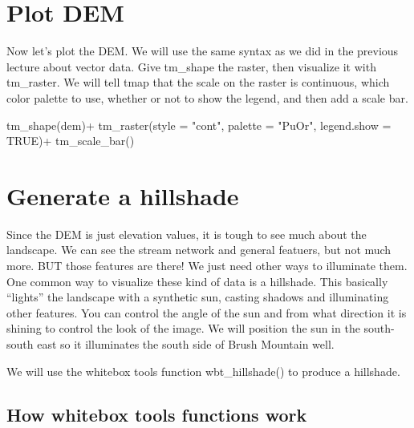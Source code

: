 \documentclass[
]{book}
\newenvironment{Shaded}{\begin{snugshade}}{\end{snugshade}}
\newcommand{\AttributeTok}[1]{\textcolor[rgb]{0.77,0.63,0.00}{#1}}
\newcommand{\ConstantTok}[1]{\textcolor[rgb]{0.00,0.00,0.00}{#1}}
\newcommand{\FunctionTok}[1]{\textcolor[rgb]{0.00,0.00,0.00}{#1}}
\newcommand{\NormalTok}[1]{#1}
\newcommand{\SpecialCharTok}[1]{\textcolor[rgb]{0.00,0.00,0.00}{#1}}
\newcommand{\StringTok}[1]{\textcolor[rgb]{0.31,0.60,0.02}{#1}}
\begin{document}
\hypertarget{plot-dem}{%
\section{Plot DEM}\label{plot-dem}}

Now let's plot the DEM. We will use the same syntax as we did in the previous lecture about vector data. Give tm\_shape the raster, then visualize it with tm\_raster. We will tell tmap that the scale on the raster is continuous, which color palette to use, whether or not to show the legend, and then add a scale bar.

\begin{Shaded}
\begin{Highlighting}[]
\FunctionTok{tm\_shape}\NormalTok{(dem)}\SpecialCharTok{+}
  \FunctionTok{tm\_raster}\NormalTok{(}\AttributeTok{style =} \StringTok{"cont"}\NormalTok{, }\AttributeTok{palette =} \StringTok{"PuOr"}\NormalTok{, }\AttributeTok{legend.show =} \ConstantTok{TRUE}\NormalTok{)}\SpecialCharTok{+}
  \FunctionTok{tm\_scale\_bar}\NormalTok{()}
\end{Highlighting}
\end{Shaded}

\hypertarget{generate-a-hillshade}{%
\section{Generate a hillshade}\label{generate-a-hillshade}}

Since the DEM is just elevation values, it is tough to see much about the landscape. We can see the stream network and general featuers, but not much more. BUT those features are there! We just need other ways to illuminate them. One common way to visualize these kind of data is a hillshade. This basically ``lights'' the landscape with a synthetic sun, casting shadows and illuminating other features. You can control the angle of the sun and from what direction it is shining to control the look of the image. We will position the sun in the south-south east so it illuminates the south side of Brush Mountain well.

We will use the whitebox tools function wbt\_hillshade() to produce a hillshade.

\hypertarget{how-whitebox-tools-functions-work}{%
\subsection{How whitebox tools functions work}\label{how-whitebox-tools-functions-work}}
\end{document}
